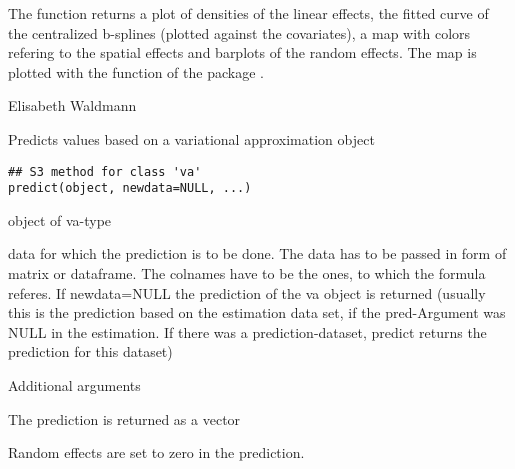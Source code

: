 \documentclass[a4paper]{book}
\begin{document}
%
\begin{Details}\relax
The function returns a plot of densities of the linear effects, the fitted curve of the centralized b-splines (plotted against the covariates), a map with colors refering to the spatial effects and barplots of the random effects. The map is plotted with the function  of the package .

\end{Details}
%
\begin{Author}\relax
Elisabeth Waldmann \\{}
\end{Author}
%
\begin{Description}\relax

Predicts values based on a variational approximation object
\end{Description}
%
\begin{Usage}
\begin{verbatim}
## S3 method for class 'va'
predict(object, newdata=NULL, ...)
\end{verbatim}
\end{Usage}
%
\begin{Arguments}
\begin{ldescription}
\item[\code{object}] 
object of va-type
\item[\code{newdata}] 
data for which the prediction is to be done. The data has to be passed in form of matrix or dataframe. The colnames have to be the ones, to which the formula referes. If newdata=NULL the prediction of the va object is returned 
(usually this is the prediction based on the estimation data set, if the pred-Argument was NULL in the estimation. 
If there was a prediction-dataset, predict returns the prediction for this dataset)

\item[\code{...}] Additional arguments

\end{ldescription}
\end{Arguments}
%
\begin{Value}
The prediction is returned as a vector
\end{Value}
%
\begin{Note}\relax
Random effects are set to zero in the prediction.
\end{Note}
\end{document}
